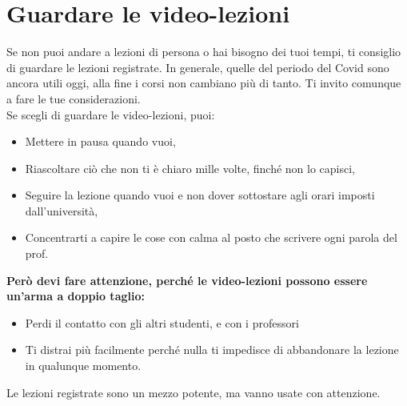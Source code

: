\documentclass[18pt]{extarticle}
\begin{document}
\section{Guardare le video-lezioni}
Se non puoi andare a lezioni di persona o hai bisogno dei tuoi tempi, ti consiglio di guardare le lezioni registrate. In generale, quelle del periodo del Covid sono ancora utili oggi, alla fine i corsi non cambiano più di tanto. Ti invito comunque a fare le tue considerazioni.\\
Se scegli di guardare le video-lezioni, puoi:
\begin{itemize}
\item Mettere in pausa quando vuoi,
\item Riascoltare ciò che non ti è chiaro mille volte, finché non lo capisci, 
\item Seguire la lezione quando vuoi e non dover sottostare agli orari imposti dall'università, 
\item Concentrarti a capire le cose con calma al posto che scrivere ogni parola del prof. 
\end{itemize}%
\textbf{Però devi fare attenzione, perché le video-lezioni possono essere un'arma a doppio taglio:}
\begin{itemize}
\item Perdi il contatto con gli altri studenti, e con i professori
\item Ti distrai più facilmente perché nulla ti impedisce di abbandonare la lezione in qualunque momento.
\end{itemize}%
Le lezioni registrate sono un mezzo potente, ma vanno usate con attenzione.
\end{document}
